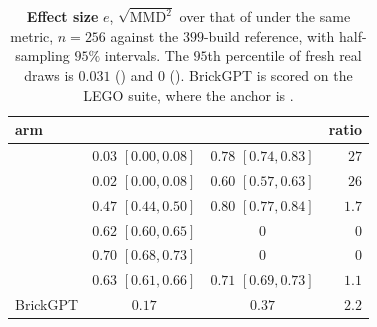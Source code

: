 \begin{table}[h]
\centering
\small
\setlength{\tabcolsep}{3pt}
\caption{\textbf{Effect size} $e$, $\sqrt{\mathrm{MMD}^2}$ over that of \randomvox{} under
the same metric, $n{=}256$ against the $399$-build reference, with half-sampling $95\%$
intervals. The $95$th percentile of fresh real draws is $0.031$ (\mvkid{}) and $0$
(\vkid{}). BrickGPT is scored on the LEGO suite, where the anchor is \singlemode{}.}
\label{tab:effect}
\begin{tabular}{lccr}
\toprule
arm & \mvkid{} & \vkid{} & ratio \\
\midrule
\solidify{}     & $0.03$ {\scriptsize$[0.00, 0.08]$} & $0.78$ {\scriptsize$[0.74, 0.83]$} & $27$ \\
\hollow{}       & $0.02$ {\scriptsize$[0.00, 0.08]$} & $0.60$ {\scriptsize$[0.57, 0.63]$} & $26$ \\
\growshell{}    & $0.47$ {\scriptsize$[0.44, 0.50]$} & $0.80$ {\scriptsize$[0.77, 0.84]$} & $1.7$ \\
\matshuffle{}   & $0.62$ {\scriptsize$[0.60, 0.65]$} & $0$                                & $0$ \\
\monochrome{}   & $0.70$ {\scriptsize$[0.68, 0.73]$} & $0$                                & $0$ \\
\patchstitch{}  & $0.63$ {\scriptsize$[0.61, 0.66]$} & $0.71$ {\scriptsize$[0.69, 0.73]$} & $1.1$ \\
BrickGPT        & $0.17$                             & $0.37$                             & $2.2$ \\
\bottomrule
\end{tabular}
\end{table}



